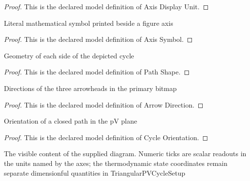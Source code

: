 \begin{proof}
  This is the declared model definition of Axis Display Unit.
\end{proof}
\begin{definition}
  \label{def:physics:phyx-mini-0418:phyxminiproblems-problemphyxmini0418-axissymbol}
  Literal mathematical symbol printed beside a figure axis
\end{definition}
\begin{proof}
  This is the declared model definition of Axis Symbol.
\end{proof}
\begin{definition}
  \label{def:physics:phyx-mini-0418:phyxminiproblems-problemphyxmini0418-pathshape}
  Geometry of each side of the depicted cycle
\end{definition}
\begin{proof}
  This is the declared model definition of Path Shape.
\end{proof}
\begin{definition}
  \label{def:physics:phyx-mini-0418:phyxminiproblems-problemphyxmini0418-arrowdirection}
  Directions of the three arrowheads in the primary bitmap
\end{definition}
\begin{proof}
  This is the declared model definition of Arrow Direction.
\end{proof}
\begin{definition}
  \label{def:physics:phyx-mini-0418:phyxminiproblems-problemphyxmini0418-cycleorientation}
  Orientation of a closed path in the pV plane
\end{definition}
\begin{proof}
  This is the declared model definition of Cycle Orientation.
\end{proof}
\begin{definition}
  \label{def:physics:phyx-mini-0418:phyxminiproblems-problemphyxmini0418-pressurevolumefigure}
  The visible content of the supplied diagram. Numeric ticks are scalar readouts in the units named by the axes; the thermodynamic state coordinates remain separate dimensionful quantities in TriangularPVCycleSetup
\end{definition}
